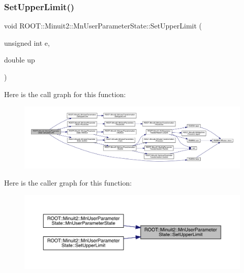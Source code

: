 \subsubsection{\texorpdfstring{SetUpperLimit()}{SetUpperLimit()}\hspace{0.1cm}{\footnotesize\ttfamily [2/4]}}
{\footnotesize\ttfamily void R\+O\+O\+T\+::\+Minuit2\+::\+Mn\+User\+Parameter\+State\+::\+Set\+Upper\+Limit (\begin{DoxyParamCaption}\item[{unsigned int}]{e,  }\item[{double}]{up }\end{DoxyParamCaption})}

Here is the call graph for this function\+:\nopagebreak
\begin{figure}[H]
\begin{center}
\leavevmode
\includegraphics[width=350pt]{d3/de0/classROOT_1_1Minuit2_1_1MnUserParameterState_ab79ab45c03ce6dcf71dfc90d967955cf_cgraph}
\end{center}
\end{figure}
Here is the caller graph for this function\+:\nopagebreak
\begin{figure}[H]
\begin{center}
\leavevmode
\includegraphics[width=350pt]{d3/de0/classROOT_1_1Minuit2_1_1MnUserParameterState_ab79ab45c03ce6dcf71dfc90d967955cf_icgraph}
\end{center}
\end{figure}
\mbox{\label{classROOT_1_1Minuit2_1_1MnUserParameterState_ab61a4e78b23aa76315662cf9bd07a012}} 
